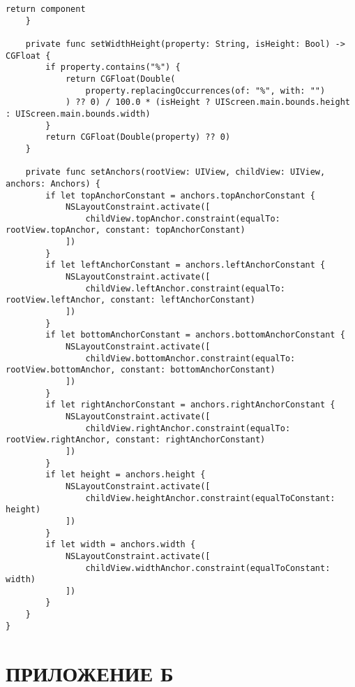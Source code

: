 \begin{lstlisting}[caption={Функция определения списка событий, по свершению которых происходит перезагрузка}]
        return component
    }

    private func setWidthHeight(property: String, isHeight: Bool) -> CGFloat {
        if property.contains("%") {
            return CGFloat(Double(
                property.replacingOccurrences(of: "%", with: "")
            ) ?? 0) / 100.0 * (isHeight ? UIScreen.main.bounds.height : UIScreen.main.bounds.width)
        }
        return CGFloat(Double(property) ?? 0)
    }

    private func setAnchors(rootView: UIView, childView: UIView, anchors: Anchors) {
        if let topAnchorConstant = anchors.topAnchorConstant {
            NSLayoutConstraint.activate([
                childView.topAnchor.constraint(equalTo: rootView.topAnchor, constant: topAnchorConstant)
            ])
        }
        if let leftAnchorConstant = anchors.leftAnchorConstant {
            NSLayoutConstraint.activate([
                childView.leftAnchor.constraint(equalTo: rootView.leftAnchor, constant: leftAnchorConstant)
            ])
        }
        if let bottomAnchorConstant = anchors.bottomAnchorConstant {
            NSLayoutConstraint.activate([
                childView.bottomAnchor.constraint(equalTo: rootView.bottomAnchor, constant: bottomAnchorConstant)
            ])
        }
        if let rightAnchorConstant = anchors.rightAnchorConstant {
            NSLayoutConstraint.activate([
                childView.rightAnchor.constraint(equalTo: rootView.rightAnchor, constant: rightAnchorConstant)
            ])
        }
        if let height = anchors.height {
            NSLayoutConstraint.activate([
                childView.heightAnchor.constraint(equalToConstant: height)
            ])
        }
        if let width = anchors.width {
            NSLayoutConstraint.activate([
                childView.widthAnchor.constraint(equalToConstant: width)
            ])
        }
    }
}
\end{lstlisting}

\pagebreak

\section*{ПРИЛОЖЕНИЕ Б}

